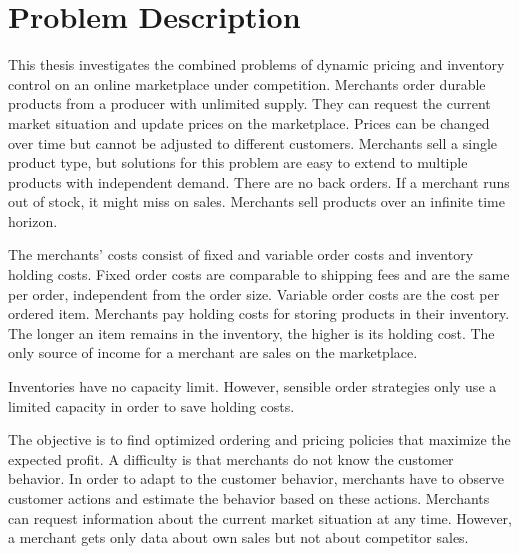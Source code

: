 
\chapter{Problem Description}
This thesis investigates the combined problems of dynamic pricing and inventory control on an online marketplace under competition.
Merchants order durable products from a producer with unlimited supply. 
They can request the current market situation and update prices on the marketplace.
Prices can be changed over time but cannot be adjusted to different customers.
Merchants sell a single product type, but solutions for this problem are easy to extend to multiple products with independent demand.
There are no back orders. If a merchant runs out of stock, it might miss on sales.
Merchants sell products over an infinite time horizon.

The merchants' costs consist of fixed and variable order costs and inventory holding costs.
Fixed order costs are comparable to shipping fees and are the same per order, independent from the order size.
Variable order costs are the cost per ordered item.
Merchants pay holding costs for storing products in their inventory.
The longer an item remains in the inventory, the higher is its holding cost. 
The only source of income for a merchant are sales on the marketplace.

Inventories have no capacity limit.
However, sensible order strategies only use a limited capacity in order to save holding costs.

The objective is to find optimized ordering and pricing policies that maximize the expected profit.
A difficulty is that merchants do not know the customer behavior.
In order to adapt to the customer behavior, merchants have to observe customer actions and estimate the behavior based on these actions.
Merchants can request information about the current market situation at any time.
However, a merchant gets only data about own sales but not about competitor sales.
